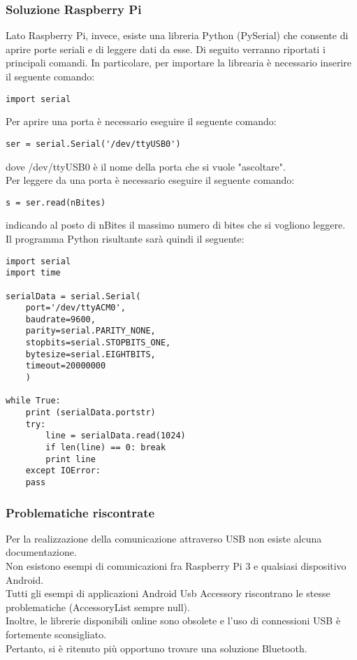 \documentclass{article}
\begin{document}
\subsubsection{Soluzione Raspberry Pi}
Lato Raspberry Pi, invece, esiste una libreria Python (PySerial) che consente di aprire porte seriali e di leggere dati da esse. Di seguito verranno riportati i principali comandi. In particolare, per importare la librearia è necessario inserire il seguente comando:
\begin{lstlisting}
import serial
\end{lstlisting}
Per aprire una porta è necessario eseguire il seguente comando:
\begin{lstlisting}
ser = serial.Serial('/dev/ttyUSB0')
\end{lstlisting}
dove /dev/ttyUSB0 è il nome della porta che si vuole "ascoltare".
\\Per leggere da una porta è necessario eseguire il seguente comando:
\begin{lstlisting}
s = ser.read(nBites)
\end{lstlisting}
indicando al posto di nBites il massimo numero di bites che si vogliono leggere.\\
Il programma Python risultante sarà quindi il seguente:
\begin{lstlisting}
import serial
import time

serialData = serial.Serial(
    port='/dev/ttyACM0',
    baudrate=9600,
    parity=serial.PARITY_NONE,
    stopbits=serial.STOPBITS_ONE,
    bytesize=serial.EIGHTBITS,
    timeout=20000000
    )

while True:
    print (serialData.portstr)
    try:
        line = serialData.read(1024)
        if len(line) == 0: break
        print line
    except IOError:
	pass
\end{lstlisting}
\subsubsection{Problematiche riscontrate}
Per la realizzazione della comunicazione attraverso USB non esiste alcuna documentazione. \\
Non esistono esempi di comunicazioni fra Raspberry Pi 3 e qualsiasi dispositivo Android. \\
Tutti gli esempi di applicazioni Android Usb Accessory riscontrano le stesse problematiche (AccessoryList sempre null).\\
Inoltre, le librerie disponibili online sono obsolete e l'uso di connessioni USB è fortemente sconsigliato. \\
Pertanto, si è ritenuto più opportuno trovare una soluzione Bluetooth.
\end{document}
